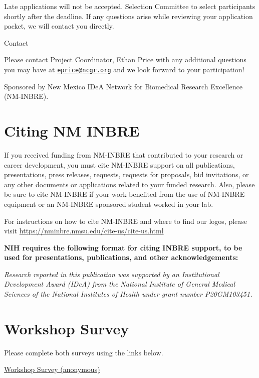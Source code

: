 \documentclass[
]{book}
\begin{document}
Late applications will not be accepted. Selection Committee to select participants shortly after the deadline. If any questions arise while reviewing your application packet, we will contact you directly.

Contact

Please contact Project Coordinator, Ethan Price with any additional questions you may have at \href{mailto:eprice@ncgr.org}{\nolinkurl{eprice@ncgr.org}} and we look forward to your participation!

Sponsored by New Mexico IDeA Network for Biomedical Research Excellence (NM-INBRE).

\hypertarget{citing-nm-inbre}{%
\chapter*{Citing NM INBRE}\label{citing-nm-inbre}}

If you received funding from NM-INBRE that contributed to your research or career development, you must cite NM-INBRE support on all publications, presentations, press releases, requests, requests for proposals, bid invitations, or any other documents or applications related to your funded research. Also, please be sure to cite NM-INBRE if your work benefited from the use of NM-INBRE equipment or an NM-INBRE sponsored student worked in your lab.

For instructions on how to cite NM-INBRE and where to find our logos, please visit \url{https://nminbre.nmsu.edu/cite-us/cite-us.html}

{\textbf{NIH requires the following format for citing INBRE support, to be used for presentations, publications, and other acknowledgements:}}

{\emph{Research reported in this publication was supported by an Institutional Development Award (IDeA) from the National Institute of General Medical Sciences of the National Institutes of Health under grant number P20GM103451.}}

\hypertarget{workshop-survey}{%
\chapter*{Workshop Survey}\label{workshop-survey}}

Please complete both surveys using the links below.

\href{https://docs.google.com/forms/d/e/1FAIpQLScjtEvK-ywP9DEbTNsIcIn4YMe9evXvhmp-NVzn-t4MSakXig/viewform?usp=sf_link}{Workshop Survey (anonymous)}
\end{document}
